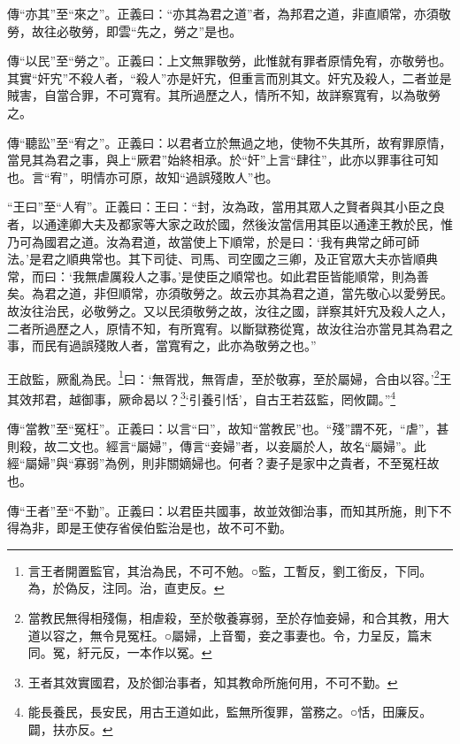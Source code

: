 {\noindent\zhuan{}\fzbyks 傳“亦其”至“來之”。正義曰：“亦其為君之道”者，為邦君之道，非直順常，亦須敬勞，故往必敬勞，即雲“先之，勞之”是也。 \par}

{\noindent\zhuan{}\fzbyks 傳“以民”至“勞之”。正義曰：上文無罪敬勞，此惟就有罪者原情免宥，亦敬勞也。其實“奸宄”不殺人者，“殺人”亦是奸宄，但重言而別其文。奸宄及殺人，二者並是賊害，自當合罪，不可寬宥。其所過歷之人，情所不知，故詳察寬宥，以為敬勞之。 \par}

{\noindent\zhuan{}\fzbyks 傳“聽訟”至“宥之”。正義曰：以君者立於無過之地，使物不失其所，故宥罪原情，當見其為君之事，與上“厥君”始終相承。於“奸”上言“肆往”，此亦以罪事往可知也。言“宥”，明情亦可原，故知“過誤殘敗人”也。 \par}

{\noindent\shu{}\fzkt “王曰”至“人宥”。正義曰：王曰：“封，汝為政，當用其眾人之賢者與其小臣之良者，以通達卿大夫及都家等大家之政於國，然後汝當信用其臣以通達王教於民，惟乃可為國君之道。汝為君道，故當使上下順常，於是曰：‘我有典常之師可師法。’是君之順典常也。其下司徒、司馬、司空國之三卿，及正官眾大夫亦皆順典常，而曰：‘我無虐厲殺人之事。’是使臣之順常也。如此君臣皆能順常，則為善矣。為君之道，非但順常，亦須敬勞之。故云亦其為君之道，當先敬心以愛勞民。故汝往治民，必敬勞之。又以民須敬勞之故，汝往之國，詳察其奸宄及殺人之人，二者所過歷之人，原情不知，有所寬宥。以斷獄務從寬，故汝往治亦當見其為君之事，而民有過誤殘敗人者，當寬宥之，此亦為敬勞之也。” \par}

王啟監，厥亂為民。\footnote{言王者開置監官，其治為民，不可不勉。○監，工暫反，劉工銜反，下同。為，於偽反，注同。治，直吏反。}曰：‘無胥戕，無胥虐，至於敬寡，至於屬婦，合由以容。’\footnote{當教民無得相殘傷，相虐殺，至於敬養寡弱，至於存恤妾婦，和合其教，用大道以容之，無令見冤枉。○屬婦，上音蜀，妾之事妻也。令，力呈反，篇末同。冤，紆元反，一本作以冤。}王其效邦君，越御事，厥命曷以？\footnote{王者其效實國君，及於御治事者，知其教命所施何用，不可不勤。}‘引養引恬’，自古王若茲監，罔攸闢。”\footnote{能長養民，長安民，用古王道如此，監無所復罪，當務之。○恬，田廉反。闢，扶亦反。}

{\noindent\zhuan{}\fzbyks 傳“當教”至“冤枉”。正義曰：以言“曰”，故知“當教民”也。“殘”謂不死，“虐”，甚則殺，故二文也。經言“屬婦”，傳言“妾婦”者，以妾屬於人，故名“屬婦”。此經“屬婦”與“寡弱”為例，則非關嫡婦也。何者？妻子是家中之貴者，不至冤枉故也。 \par}

{\noindent\zhuan{}\fzbyks 傳“王者”至“不勤”。正義曰：以君臣共國事，故並效御治事，而知其所施，則下不得為非，即是王使存省侯伯監治是也，故不可不勤。 \par}

